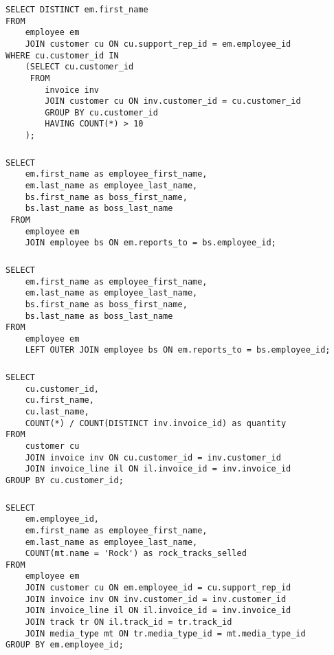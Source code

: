 \subsubsection{}
\begin{verbatim}
SELECT DISTINCT em.first_name
FROM
	employee em
	JOIN customer cu ON cu.support_rep_id = em.employee_id
WHERE cu.customer_id IN 
	(SELECT cu.customer_id
	 FROM
		invoice inv
		JOIN customer cu ON inv.customer_id = cu.customer_id
		GROUP BY cu.customer_id
		HAVING COUNT(*) > 10
	);
\end{verbatim}

\subsubsection{}
\begin{verbatim}
SELECT 
	em.first_name as employee_first_name,
	em.last_name as employee_last_name,
	bs.first_name as boss_first_name,
	bs.last_name as boss_last_name
 FROM
 	employee em
	JOIN employee bs ON em.reports_to = bs.employee_id;
\end{verbatim}

\newpage
\subsubsection{}
\begin{verbatim}
SELECT 
	em.first_name as employee_first_name,
	em.last_name as employee_last_name,
	bs.first_name as boss_first_name,
	bs.last_name as boss_last_name
FROM
	employee em
	LEFT OUTER JOIN employee bs ON em.reports_to = bs.employee_id;
\end{verbatim}

\subsubsection{}
\begin{verbatim}
SELECT 
	cu.customer_id,
	cu.first_name,
	cu.last_name,
	COUNT(*) / COUNT(DISTINCT inv.invoice_id) as quantity
FROM 
	customer cu
	JOIN invoice inv ON cu.customer_id = inv.customer_id
	JOIN invoice_line il ON il.invoice_id = inv.invoice_id
GROUP BY cu.customer_id;
\end{verbatim}

\subsubsection{}
\begin{verbatim}
SELECT
	em.employee_id,
	em.first_name as employee_first_name,
	em.last_name as employee_last_name,
	COUNT(mt.name = 'Rock') as rock_tracks_selled
FROM
	employee em
	JOIN customer cu ON em.employee_id = cu.support_rep_id
	JOIN invoice inv ON inv.customer_id = inv.customer_id
	JOIN invoice_line il ON il.invoice_id = inv.invoice_id
	JOIN track tr ON il.track_id = tr.track_id
	JOIN media_type mt ON tr.media_type_id = mt.media_type_id
GROUP BY em.employee_id;
\end{verbatim}

